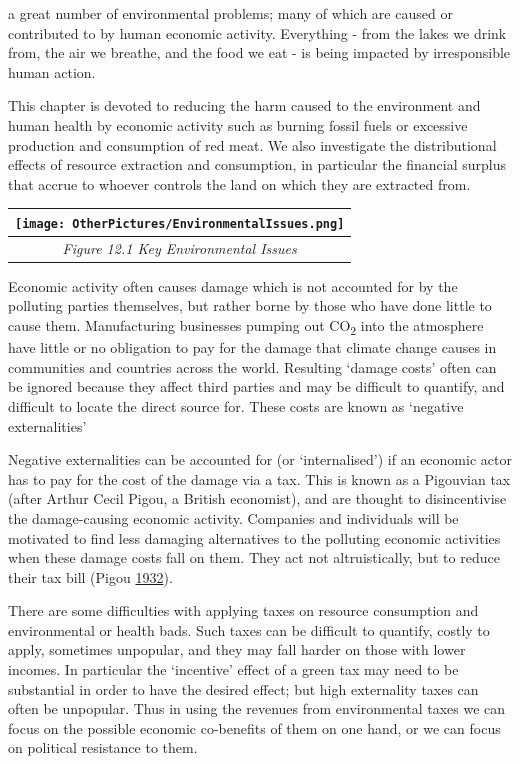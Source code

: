 \documentclass[]{tufte-handout}
\begin{document}
 a great number of environmental
problems; many of which are caused or contributed to by human economic
activity. Everything - from the lakes we drink from, the air we breathe,
and the food we eat - is being impacted by irresponsible human action.

This chapter is devoted to reducing the harm caused to the environment
and human health by economic activity such as burning fossil fuels or
excessive production and consumption of red meat. We also investigate
the distributional effects of resource extraction and consumption, in
particular the financial surplus that accrue to whoever controls the
land on which they are extracted from.

\begin{longtable}[]{@{}c@{}}
\toprule
\texttt{[image: OtherPictures/EnvironmentalIssues.png]}\tabularnewline
\midrule
\endhead
\emph{Figure 12.1 Key Environmental Issues}\tabularnewline
\bottomrule
\end{longtable}

Economic activity often causes damage which is not accounted for by the
polluting parties themselves, but rather borne by those who have done
little to cause them. Manufacturing businesses pumping out
CO\textsubscript{2} into the atmosphere have little or no obligation to
pay for the damage that climate change causes in communities and
countries across the world. Resulting `damage costs' often can be
ignored because they affect third parties and may be difficult to
quantify, and difficult to locate the direct source for. These costs are
known as `negative externalities'

Negative externalities can be accounted for (or `internalised') if an
economic actor has to pay for the cost of the damage via a tax. This is
known as a Pigouvian tax (after Arthur Cecil Pigou, a British
economist), and are thought to disincentivise the damage-causing
economic activity. Companies and individuals will be motivated to find
less damaging alternatives to the polluting economic activities when
these damage costs fall on them. They act not altruistically, but to
reduce their tax bill (Pigou \protect\hyperlink{ref-Pigou1932}{1932}).

There are some difficulties with applying taxes on resource consumption
and environmental or health bads. Such taxes can be difficult to
quantify, costly to apply, sometimes unpopular, and they may fall harder
on those with lower incomes. In particular the `incentive' effect of a
green tax may need to be substantial in order to have the desired
effect; but high externality taxes can often be unpopular. Thus in using
the revenues from environmental taxes we can focus on the possible
economic co-benefits of them on one hand, or we can focus on political
resistance to them.
\end{document}
